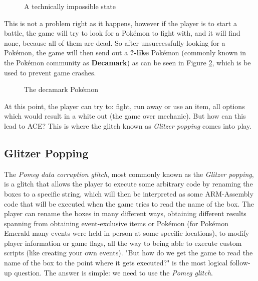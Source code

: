 \documentclass[a4paper]{usiinfbachelorproject}
\begin{document}
\begin{figure}[h!]
	\caption{A technically impossible state}\label{fig:dead_team}
\end{figure}

This is not a problem right as it happens, however if the player is to start a battle, the game will try to look for a Pokémon to fight with, and it will find none, because all of them are dead. So after unsuccessfully looking for a Pokémon, the game will then send out a \textbf{?-like} Pokémon (commonly known in the Pokémon community as \textbf{Decamark}) as can be seen in Figure \ref{fig:decamark}, which is be used to prevent game crashes.

\begin{figure}[h!]
	\caption{The decamark Pokémon}\label{fig:decamark}
\end{figure}

At this point, the player can try to: fight, run away or use an item, all options which would result in a white out (the game over mechanic). But how can this lead to ACE? This is where the glitch known as \textit{Glitzer popping} comes into play.

\subsection{\textbf{Glitzer Popping}}
\label{sec:glitzer_popping}
The \textit{Pomeg data corruption glitch}, most commonly known as the \textit{Glitzer popping}, is a glitch that allows the player to execute some arbitrary code by renaming the boxes to a specific string, which will then be interpreted as some ARM-Assembly code that will be executed when the game tries to read the name of the box. The player can rename the boxes in many different ways, obtaining different results spanning from obtaining event-exclusive items or Pokémon (for Pokémon Emerald many events were held in-person at some specific locations), to modify player information or game flags, all the way to being able to execute custom scripts (like creating your own events). "But how do we get the game to read the name of the box to the point where it gets executed?" is the most logical follow-up question. The answer is simple: we need to use the \textit{Pomeg glitch}.
\end{document}
